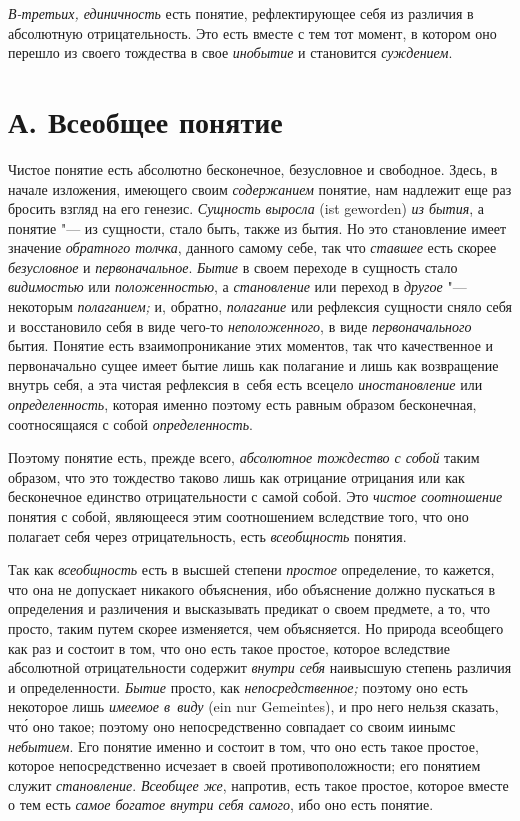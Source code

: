 {\em В-третьих, единичность} есть
понятие, рефлектирующее себя из различия в абсолютную отрицательность. Это
есть вместе с тем тот момент, в котором оно перешло из своего тождества в
свое {\em инобытие} и становится {\em суждением}.

\section[А. Всеобщее понятие]{А. Всеобщее понятие}

Чистое понятие есть абсолютно бесконечное, безусловное и свободное. Здесь,
в начале изложения, имеющего своим {\em содержанием} понятие, нам надлежит
еще раз бросить взгляд на его генезис. {\em Сущность выросла} (ist geworden)
{\em из бытия}, а понятие "--- из сущности, стало быть, также из бытия.
Но это становление имеет значение {\em обратного толчка}, данного самому себе,
так что {\em ставшее} есть скорее {\em безусловное} и {\em первоначальное}.
{\em Бытие} в своем переходе в сущность стало {\em видимостью} или
{\em положенностью}, а {\em становление} или переход
в {\em другое} "--- некоторым {\em полаганием;} и, обратно, {\em полагание}
или рефлексия сущности сняло себя и восстановило себя в виде чего-то
{\em неположенного}, в виде {\em первоначального} бытия. Понятие есть
взаимопроникание этих моментов, так что качественное и первоначально сущее
имеет бытие лишь как полагание и лишь как возвращение внутрь себя, а эта
чистая рефлексия в~себя есть всецело {\em иностановление} или
{\em определенность}, которая именно поэтому есть равным образом
бесконечная, соотносящаяся с собой {\em определенность}.

Поэтому понятие есть, прежде всего, {\em абсолютное тождество с собой}
таким образом, что это тождество таково лишь как отрицание
отрицания или как бесконечное единство отрицательности с самой собой. Это
{\em чистое соотношение} понятия с собой, являющееся этим соотношением
вследствие того, что оно полагает себя через отрицательность, есть
{\em всеобщность} понятия.

Так как {\em всеобщность} есть в высшей степени {\em простое}
определение, то кажется, что она не допускает никакого
объяснения, ибо объяснение должно пускаться в определения и различения и
высказывать предикат о своем предмете, а то, что просто,
таким путем скорее изменяется, чем объясняется. Но природа
всеобщего как раз и состоит в том, что оно есть такое простое, которое
вследствие абсолютной отрицательности содержит {\em внутри себя}
наивысшую степень различия и определенности. {\em Бытие} просто, как
{\em непосредственное;} поэтому оно есть некоторое лишь {\em имеемое в~виду}
(ein nur Gemeintes), и про него нельзя сказать, чт\'{о} оно такое; поэтому
оно непосредственно совпадает со своим иинымс
{\em небытием}.
Его понятие именно и состоит в том, что оно есть такое
простое, которое непосредственно исчезает в своей
противоположности; его понятием служит {\em становление}. {\em Всеобщее же},
напротив, есть такое простое, которое вместе о тем есть
{\em самое богатое внутри себя самого}, ибо оно есть понятие.

